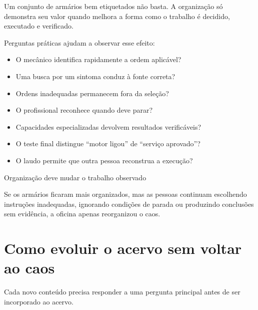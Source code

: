 \documentclass[
  10pt,
  a4paper,
  oneside]{book}
\providecommand{\tightlist}{%
  \setlength{\itemsep}{0pt}\setlength{\parskip}{0pt}}
\begin{document}
Um conjunto de armários bem etiquetados não basta. A organização só
demonstra seu valor quando melhora a forma como o trabalho é decidido,
executado e verificado.

Perguntas práticas ajudam a observar esse efeito:

\begin{itemize}
\tightlist
\item
  O mecânico identifica rapidamente a ordem aplicável?
\item
  Uma busca por um sintoma conduz à fonte correta?
\item
  Ordens inadequadas permanecem fora da seleção?
\item
  O profissional reconhece quando deve parar?
\item
  Capacidades especializadas devolvem resultados verificáveis?
\item
  O teste final distingue ``motor ligou'' de ``serviço aprovado''?
\item
  O laudo permite que outra pessoa reconstrua a execução?
\end{itemize}

\begin{evidencebox}{Organização deve mudar o trabalho observado}

Se os armários ficaram mais organizados, mas as pessoas continuam
escolhendo instruções inadequadas, ignorando condições de parada ou
produzindo conclusões sem evidência, a oficina apenas reorganizou o
caos.

\end{evidencebox}

\hypertarget{como-evoluir-o-acervo-sem-voltar-ao-caos}{%
\section{Como evoluir o acervo sem voltar ao
caos}\label{como-evoluir-o-acervo-sem-voltar-ao-caos}}

Cada novo conteúdo precisa responder a uma pergunta principal antes de
ser incorporado ao acervo.
\end{document}
